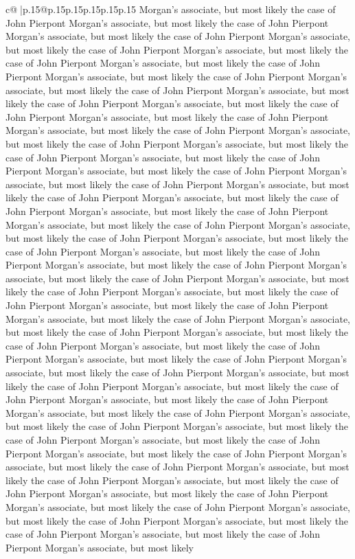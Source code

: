 \documentclass{article}
\begin{document}
{\begin{supertabular}{c@{$\;$}|p{.15\linewidth}@{}p{.15\linewidth}p{.15\linewidth}p{.15\linewidth}p{.15\linewidth}p{.15\linewidth}}
{{{Morgan's associate, but most likely the case of John Pierpont Morgan's associate, but most likely the case of John Pierpont Morgan's associate, but most likely the case of John Pierpont Morgan's associate, but most likely the case of John Pierpont Morgan's associate, but most likely the case of John Pierpont Morgan's associate, but most likely the case of John Pierpont Morgan's associate, but most likely the case of John Pierpont Morgan's associate, but most likely the case of John Pierpont Morgan's associate, but most likely the case of John Pierpont Morgan's associate, but most likely the case of John Pierpont Morgan's associate, but most likely the case of John Pierpont Morgan's associate, but most likely the case of John Pierpont Morgan's associate, but most likely the case of John Pierpont Morgan's associate, but most likely the case of John Pierpont Morgan's associate, but most likely the case of John Pierpont Morgan's associate, but most likely the case of John Pierpont Morgan's associate, but most likely the case of John Pierpont Morgan's associate, but most likely the case of John Pierpont Morgan's associate, but most likely the case of John Pierpont Morgan's associate, but most likely the case of John Pierpont Morgan's associate, but most likely the case of John Pierpont Morgan's associate, but most likely the case of John Pierpont Morgan's associate, but most likely the case of John Pierpont Morgan's associate, but most likely the case of John Pierpont Morgan's associate, but most likely the case of John Pierpont Morgan's associate, but most likely the case of John Pierpont Morgan's associate, but most likely the case of John Pierpont Morgan's associate, but most likely the case of John Pierpont Morgan's associate, but most likely the case of John Pierpont Morgan's associate, but most likely the case of John Pierpont Morgan's associate, but most likely the case of John Pierpont Morgan's associate, but most likely the case of John Pierpont Morgan's associate, but most likely the case of John Pierpont Morgan's associate, but most likely the case of John Pierpont Morgan's associate, but most likely the case of John Pierpont Morgan's associate, but most likely the case of John Pierpont Morgan's associate, but most likely the case of John Pierpont Morgan's associate, but most likely the case of John Pierpont Morgan's associate, but most likely the case of John Pierpont Morgan's associate, but most likely the case of John Pierpont Morgan's associate, but most likely the case of John Pierpont Morgan's associate, but most likely the case of John Pierpont Morgan's associate, but most likely the case of John Pierpont Morgan's associate, but most likely the case of John Pierpont Morgan's associate, but most likely the case of John Pierpont Morgan's associate, but most likely the case of John Pierpont Morgan's associate, but most likely the case of John Pierpont Morgan's associate, but most likely the case of John Pierpont Morgan's associate, but most likely the case of John Pierpont Morgan's associate, but most likely the case of John Pierpont Morgan's associate, but most likely the case of John Pierpont Morgan's associate, but most likely }}}
\end{supertabular}}
\end{document}

